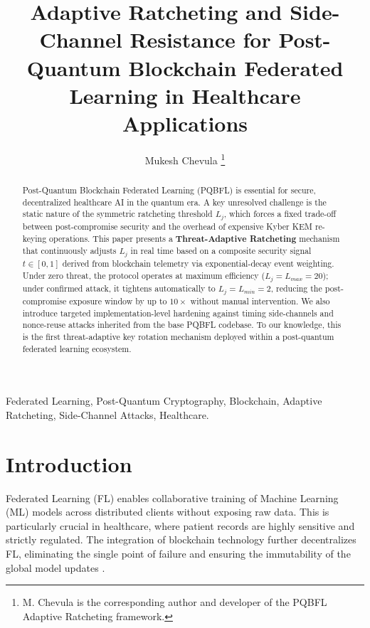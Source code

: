 \documentclass[journal, 10pt, twocolumn]{IEEEtran}
\begin{document}
\title{Adaptive Ratcheting and Side-Channel Resistance for Post-Quantum Blockchain Federated Learning in Healthcare Applications}

\author{Mukesh Chevula
\thanks{M. Chevula is the corresponding author and developer of the PQBFL Adaptive Ratcheting framework.}}

\maketitle

\begin{abstract}
Post-Quantum Blockchain Federated Learning (PQBFL) is essential for secure, decentralized healthcare AI in the quantum era. A key unresolved challenge is the static nature of the symmetric ratcheting threshold $L_j$, which forces a fixed trade-off between post-compromise security and the overhead of expensive Kyber KEM re-keying operations. This paper presents a \textbf{Threat-Adaptive Ratcheting} mechanism that continuously adjusts $L_j$ in real time based on a composite security signal $t \in [0,1]$ derived from blockchain telemetry via exponential-decay event weighting. Under zero threat, the protocol operates at maximum efficiency ($L_j = L_{max} = 20$); under confirmed attack, it tightens automatically to $L_j = L_{min} = 2$, reducing the post-compromise exposure window by up to $10\times$ without manual intervention. We also introduce targeted implementation-level hardening against timing side-channels and nonce-reuse attacks inherited from the base PQBFL codebase. To our knowledge, this is the first threat-adaptive key rotation mechanism deployed within a post-quantum federated learning ecosystem.
\end{abstract}

\begin{IEEEkeywords}
Federated Learning, Post-Quantum Cryptography, Blockchain, Adaptive Ratcheting, Side-Channel Attacks, Healthcare.
\end{IEEEkeywords}

\section{Introduction}
Federated Learning (FL) enables collaborative training of Machine Learning (ML) models across distributed clients without exposing raw data. This is particularly crucial in healthcare, where patient records are highly sensitive and strictly regulated. The integration of blockchain technology further decentralizes FL, eliminating the single point of failure and ensuring the immutability of the global model updates \cite{bdfll23}.
\end{document}
